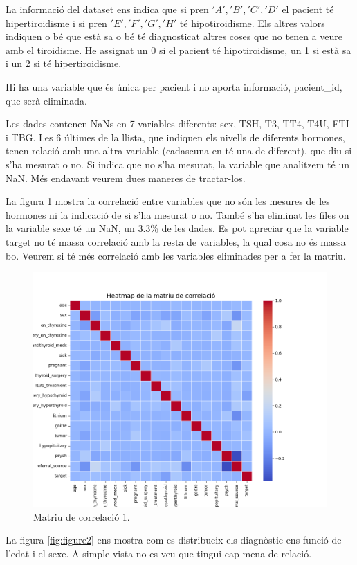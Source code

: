 \documentclass[9pt,a4paper,twoside]{tau-class/tau}
\begin{document}
    La informació del dataset ens indica que si pren $'A', 'B', 'C', 'D'$ el pacient té hipertiroidisme i si pren $'E', 'F', 'G', 'H'$ té hipotiroidisme. Els altres valors indiquen o bé que està sa o bé té diagnosticat altres coses que no tenen a veure amb el tiroidisme. He assignat un 0 si el pacient té hipotiroidisme, un 1 si està sa i un 2 si té hipertiroidisme.
    
    Hi ha una variable que és única per pacient i no aporta informació, pacient\_id, que serà eliminada.

    Les dades contenen NaNs en 7 variables diferents: sex, TSH, T3, TT4, T4U, FTI i TBG. Les 6 últimes de la llista, que indiquen els nivells de diferents hormones, tenen relació amb una altra variable (cadascuna en té una de diferent), que diu si s'ha mesurat o no. Si indica que no s'ha mesurat, la variable que analitzem té un NaN. Més endavant veurem dues maneres de tractar-los.

    La figura \ref{fig:figure1} mostra la correlació entre variables que no són les mesures de les hormones ni la indicació de si s'ha mesurat o no. També s'ha eliminat les files on la variable sexe té un NaN, un 3.3\% de les dades. Es pot apreciar que la variable target no té massa correlació amb la resta de variables, la qual cosa no és massa bo. Veurem si té més correlació amb les variables eliminades per a fer la matriu.

    \begin{figure}[H]
		\centering
		\includegraphics[width=0.75\columnwidth]{correlation_matrix_atributs_no_mesures.png}
		\caption{Matriu de correlació 1.}
		\label{fig:figure1}
	\end{figure}

    La figura \ref{fig:figure2} ens mostra com es distribueix els diagnòstic ens funció de l'edat i el sexe. A simple vista no es veu que tingui cap mena de relació.
\end{document}
